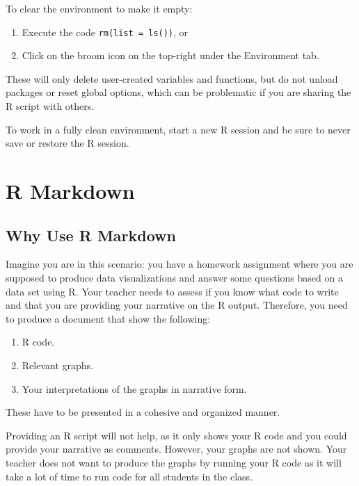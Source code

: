\documentclass[
]{book}
\providecommand{\tightlist}{%
  \setlength{\itemsep}{0pt}\setlength{\parskip}{0pt}}
\theoremstyle{definition}
\theoremstyle{definition}
\theoremstyle{definition}
\theoremstyle{definition}
\theoremstyle{remark}
\begin{document}
To clear the environment to make it empty:

\begin{enumerate}
\def\labelenumi{\arabic{enumi}.}
\tightlist
\item
  Execute the code \texttt{rm(list\ =\ ls())}, or
\item
  Click on the broom icon on the top-right under the Environment tab.
\end{enumerate}

These will only delete user-created variables and functions, but do not unload packages or reset global options, which can be problematic if you are sharing the R script with others.

To work in a fully clean environment, start a new R session and be sure to never save or restore the R session.

\hypertarget{rmd}{%
\chapter{R Markdown}\label{rmd}}

\hypertarget{why-use-r-markdown}{%
\section{Why Use R Markdown}\label{why-use-r-markdown}}

Imagine you are in this scenario: you have a homework assignment where you are supposed to produce data visualizations and answer some questions based on a data set using R. Your teacher needs to assess if you know what code to write and that you are providing your narrative on the R output. Therefore, you need to produce a document that show the following:

\begin{enumerate}
\def\labelenumi{\arabic{enumi}.}
\tightlist
\item
  R code.
\item
  Relevant graphs.
\item
  Your interpretations of the graphs in narrative form.
\end{enumerate}

These have to be presented in a cohesive and organized manner.

Providing an R script will not help, as it only shows your R code and you could provide your narrative as comments. However, your graphs are not shown. Your teacher does not want to produce the graphs by running your R code as it will take a lot of time to run code for all students in the class.
\end{document}
